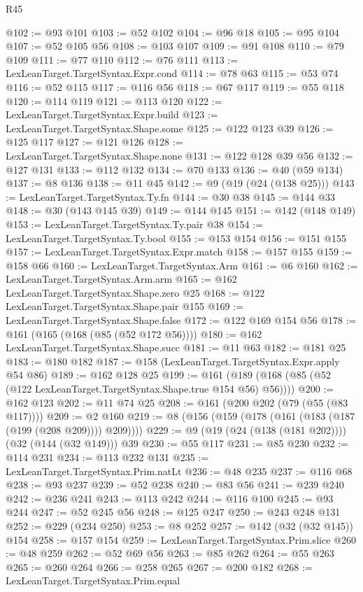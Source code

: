 \begin{lexlean}{R45}
\begin{coremodule}
@102 := @93 @101
@103 := @52 @102
@104 := @96 @18
@105 := @95 @104
@107 := @52 @105 @56
@108 := @103 @107
@109 := @91 @108
@110 := @79 @109
@111 := @77 @110
@112 := @76 @111
@113 := LexLeanTarget.TargetSyntax.Expr.cond
@114 := @78 @63
@115 := @53 @74
@116 := @52 @115
@117 := @116 @56
@118 := @67 @117
@119 := @55 @118
@120 := @114 @119
@121 := @113 @120
@122 := LexLeanTarget.TargetSyntax.Expr.build
@123 := LexLeanTarget.TargetSyntax.Shape.some
@125 := @122 @123 @39
@126 := @125 @117
@127 := @121 @126
@128 := LexLeanTarget.TargetSyntax.Shape.none
@131 := @122 @128 @39 @56
@132 := @127 @131
@133 := @112 @132
@134 := @70 @133
@136 := @40 (@59 @134)
@137 := @8 @136
@138 := @11 @45
@142 := @9 (@19 (@24 (@138 @25)))
@143 := LexLeanTarget.TargetSyntax.Ty.fn
@144 := @30 @38
@145 := @144 @33
@148 := @30 (@143 @145 @39)
@149 := @144 @145
@151 := @142 (@148 @149)
@153 := LexLeanTarget.TargetSyntax.Ty.pair @38
@154 := LexLeanTarget.TargetSyntax.Ty.bool
@155 := @153 @154
@156 := @151 @155
@157 := LexLeanTarget.TargetSyntax.Expr.match
@158 := @157 @155
@159 := @158 @66
@160 := LexLeanTarget.TargetSyntax.Arm
@161 := @6 @160
@162 := LexLeanTarget.TargetSyntax.Arm.arm
@165 := @162 LexLeanTarget.TargetSyntax.Shape.zero @25
@168 := @122 LexLeanTarget.TargetSyntax.Shape.pair @155
@169 := LexLeanTarget.TargetSyntax.Shape.false
@172 := @122 @169 @154 @56
@178 := @161 (@165 (@168 (@85 (@52 @172 @56))))
@180 := @162 LexLeanTarget.TargetSyntax.Shape.succ
@181 := @11 @63
@182 := @181 @25
@183 := @180 @182
@187 := @158 (LexLeanTarget.TargetSyntax.Expr.apply @54 @86)
@189 := @162 @128 @25
@199 := @161 (@189 (@168 (@85 (@52 (@122 LexLeanTarget.TargetSyntax.Shape.true @154 @56) @56))))
@200 := @162 @123
@202 := @11 @74 @25
@208 := @161 (@200 @202 (@79 (@55 (@83 @117))))
@209 := @2 @160
@219 := @8 (@156 (@159 (@178 (@161 (@183 (@187 (@199 (@208 @209)))) @209))))
@229 := @9 (@19 (@24 (@138 (@181 @202)))) (@32 (@144 (@32 @149))) @39
@230 := @55 @117
@231 := @85 @230
@232 := @114 @231
@234 := @113 @232 @131
@235 := LexLeanTarget.TargetSyntax.Prim.natLt
@236 := @48 @235
@237 := @116 @68
@238 := @93 @237
@239 := @52 @238
@240 := @83 @56
@241 := @239 @240
@242 := @236 @241
@243 := @113 @242
@244 := @116 @100
@245 := @93 @244
@247 := @52 @245 @56
@248 := @125 @247
@250 := @243 @248 @131
@252 := @229 (@234 @250)
@253 := @8 @252
@257 := @142 (@32 (@32 @145)) @154
@258 := @157 @154
@259 := LexLeanTarget.TargetSyntax.Prim.slice
@260 := @48 @259
@262 := @52 @69 @56
@263 := @85 @262
@264 := @55 @263
@265 := @260 @264
@266 := @258 @265
@267 := @200 @182
@268 := LexLeanTarget.TargetSyntax.Prim.equal

\end{coremodule}
\end{lexlean}
